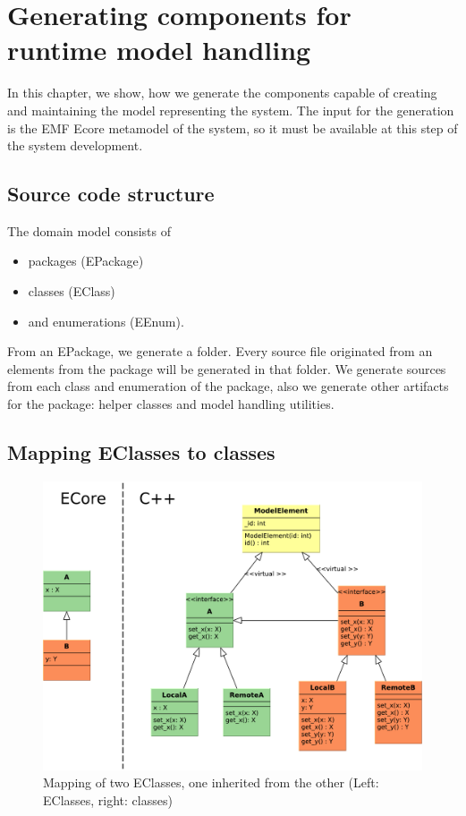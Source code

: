 \chapter{Generating components for runtime model handling}

In this chapter, we show, how we generate the \cpp{} components capable of creating and maintaining the model representing the system. 
The input for the generation is the EMF Ecore metamodel of the system, so it must be available at this step of the system development. 


\section{Source code structure}

The domain model consists of 
\begin{itemize}
	\item packages (EPackage)
	\item classes (EClass) 
	\item and enumerations (EEnum).
\end{itemize}

From an EPackage, we generate a folder. Every source file originated from an elements from the package will be generated in that folder. 
We generate sources from each class and enumeration of the package, also we generate other artifacts for the package: helper classes and model handling utilities.


\section{Mapping EClasses to \protect\cpptt{} classes}


\begin{figure}
	\begin{center}
		\includegraphics[width=\textwidth]{figures/eclass-to-cpp.pdf}
		\caption{Mapping of two EClasses, one inherited from the other (Left: EClasses, right: \protect\cpp{} classes) }
		\label{fig:eclass-to-cpp}
	\end{center}
\end{figure}


